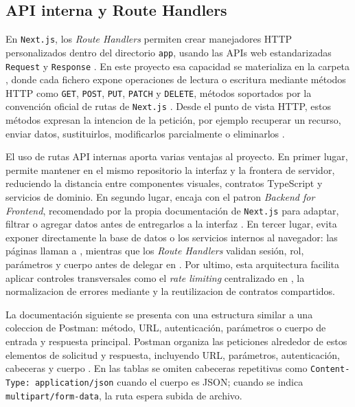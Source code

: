 \subsection{API interna y Route Handlers}
\label{subsec:internalApiRoutes}

En \texttt{Next.js}, los \textit{Route Handlers} permiten crear manejadores HTTP personalizados dentro del directorio \texttt{app}, usando las APIs web estandarizadas \texttt{Request} y \texttt{Response} \citep{nextjsroutehandlers2026}. En este proyecto esa capacidad se materializa en la carpeta , donde cada fichero  expone operaciones de lectura o escritura mediante métodos HTTP como \texttt{GET}, \texttt{POST}, \texttt{PUT}, \texttt{PATCH} y \texttt{DELETE}, métodos soportados por la convención oficial de rutas de \texttt{Next.js} \citep{nextjsroutefile2026}. Desde el punto de vista HTTP, estos métodos expresan la intencion de la petición, por ejemplo recuperar un recurso, enviar datos, sustituirlos, modificarlos parcialmente o eliminarlos \citep{mdnhttpmethods2026}.

El uso de rutas API internas aporta varias ventajas al proyecto. En primer lugar, permite mantener en el mismo repositorio la interfaz y la frontera de servidor, reduciendo la distancia entre componentes visuales, contratos TypeScript y servicios de dominio. En segundo lugar, encaja con el patron \textit{Backend for Frontend}, recomendado por la propia documentación de \texttt{Next.js} para adaptar, filtrar o agregar datos antes de entregarlos a la interfaz \citep{nextjsbackendforfrontend2026}. En tercer lugar, evita exponer directamente la base de datos o los servicios internos al navegador: las páginas llaman a , mientras que los \textit{Route Handlers} validan sesión, rol, parámetros y cuerpo antes de delegar en . Por ultimo, esta arquitectura facilita aplicar controles transversales como el \textit{rate limiting} centralizado en , la normalizacion de errores mediante  y la reutilizacion de contratos compartidos.

La documentación siguiente se presenta con una estructura similar a una coleccion de Postman: método, URL, autenticación, parámetros o cuerpo de entrada y respuesta principal. Postman organiza las peticiones alrededor de estos elementos de solicitud y respuesta, incluyendo URL, parámetros, autenticación, cabeceras y cuerpo \citep{postmanrequests2026}. En las tablas se omiten cabeceras repetitivas como \texttt{Content-Type: application/json} cuando el cuerpo es JSON; cuando se indica \texttt{multipart/form-data}, la ruta espera subida de archivo.

